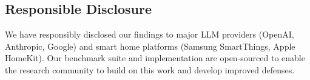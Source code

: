 \subsection{Responsible Disclosure}

We have responsibly disclosed our findings to major LLM providers (OpenAI, Anthropic, Google) and smart
home platforms (Samsung SmartThings, Apple HomeKit). Our benchmark suite and \sys{} implementation are
open-sourced to enable the research community to build on this work and develop improved defenses.